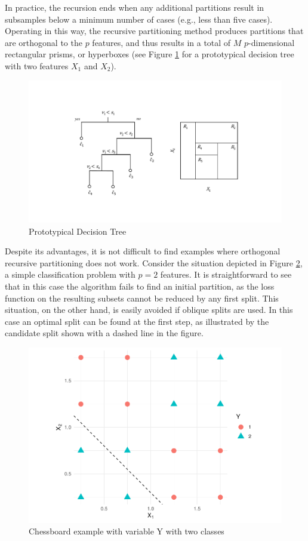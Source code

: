 \documentclass[]{elsarticle} %
\makeatletter
\def\maxwidth{\ifdim\Gin@nat@width>\linewidth\linewidth
\else\Gin@nat@width\fi}
\let\Oldincludegraphics\includegraphics
\renewcommand{\includegraphics}[1]{\Oldincludegraphics[width=\maxwidth]{#1}}
\makeatother
\begin{document}
In practice, the recursion ends when any additional partitions result in
subsamples below a minimum number of cases (e.g., less than five cases).
Operating in this way, the recursive partitioning method produces
partitions that are orthogonal to the \(p\) features, and thus results
in a total of \(M\) \(p\)-dimensional rectangular prisms, or hyperboxes
(see Figure \ref{fig:fig1-example} for a prototypical decision tree with
two features \(X_1\) and \(X_2\)).

\begin{figure}
\centering
\includegraphics{fig1-example.pdf}
\caption{\label{fig:fig1-example}Prototypical Decision Tree}
\end{figure}

Despite its advantages, it is not difficult to find examples where
orthogonal recursive partitioning does not work. Consider the situation
depicted in Figure \ref{fig:fig2-chessboard}, a simple classification
problem with \(p=2\) features. It is straightforward to see that in this
case the algorithm fails to find an initial partition, as the loss
function on the resulting subsets cannot be reduced by any first split.
This situation, on the other hand, is easily avoided if oblique splits
are used. In this case an optimal split can be found at the first step,
as illustrated by the candidate split shown with a dashed line in the
figure.

\begin{figure}
\centering
\includegraphics{Trees_with_Base_Functions_v3_files/figure-latex/fig2-chessboard-1.pdf}
\caption{\label{fig:fig2-chessboard}Chessboard example with variable Y
with two classes}
\end{figure}
\end{document}
